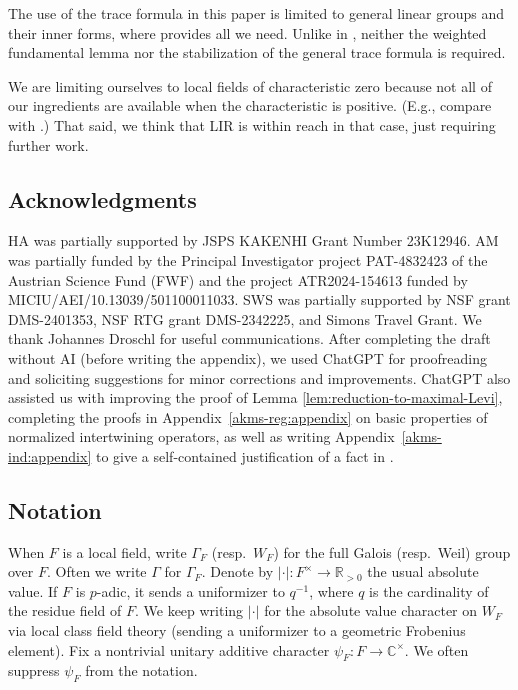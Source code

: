 \documentclass[11pt,reqno]{amsart}
\theoremstyle{plain}
\theoremstyle{definition}
\newcommand{\C}{\mathbb{C}}
\newcommand{\R}{\mathbb{R}}
\newcommand{\ra}{\rightarrow}
\numberwithin{equation}{subsection}
\begin{document}
The use of the trace formula in this paper is limited to general linear groups and their inner forms, where \cite{AC89} provides all we need. Unlike in \cite{Arthur,Mok,KMSW}, neither the weighted fundamental lemma nor the stabilization of the general trace formula is required. 

We are limiting ourselves to local fields of characteristic zero because not all of our ingredients are available when the characteristic is positive. (E.g., compare \cite{BadRoc} with \cite{Bad,BadRen}.) That said, we think that LIR is within reach in that case, just requiring further work.

\subsection{Acknowledgments}
HA was partially supported by JSPS KAKENHI Grant Number 23K12946. AM was partially funded by the Principal Investigator project PAT-4832423 of the Austrian Science Fund (FWF) and the project ATR2024-154613 funded by MICIU/AEI/10.13039/501100011033.
SWS was partially supported by NSF grant DMS-2401353, NSF RTG grant DMS-2342225, and Simons Travel Grant. We thank Johannes Droschl for useful communications. 
After completing the draft without AI (before writing the appendix), we used ChatGPT for proofreading and soliciting suggestions for minor corrections and improvements. ChatGPT also assisted us with improving the proof of Lemma \ref{lem:reduction-to-maximal-Levi}, completing the proofs in Appendix~\ref{akms-reg:appendix} on basic properties of normalized intertwining operators, as well as writing Appendix~\ref{akms-ind:appendix} to give a self-contained justification of a fact in \cite[\S2.7]{KMSW}.

\subsection{Notation}\label{ss:notation}


When $F$ is a local field, write $\Gamma_F$ (resp.~$W_F$) for the full Galois (resp.~Weil) group over $F$. Often we write $\Gamma$ for $\Gamma_F$.
Denote by $|\cdot| \colon F^\times\ra \R_{>0}$ the usual absolute value. 
If $F$ is $p$-adic, it sends a uniformizer to $q^{-1}$, 
where $q$ is the cardinality of the residue field of $F$. We keep writing $|\cdot|$ for the absolute value character on $W_F$ via local class field theory (sending a uniformizer to a geometric Frobenius element). 
Fix a nontrivial unitary additive character $\psi_F
\colon F\to \C^\times$. 
We often suppress $\psi_F$ from the notation.
\end{document}
